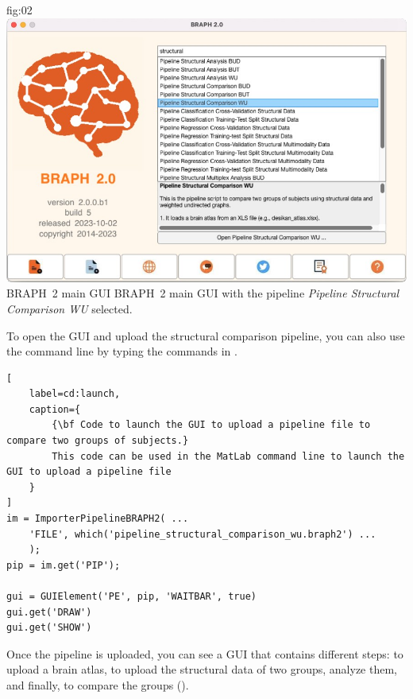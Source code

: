 \documentclass[justified]{tufte-handout}
\begin{document}
 {fig:02}
 {\includegraphics{fig02.jpg}}
	{BRAPH~2 main GUI}
	{
	BRAPH~2 main GUI with the pipeline \emph{Pipeline Structural Comparison WU} selected.
	}


\begin{tcolorbox}[
	title=Pipeline launch from command line
	]
	To open the GUI and upload the structural comparison pipeline, you can also use the command line by typing the commands in .

\begin{lstlisting}[
	label=cd:launch,
	caption={
		{\bf Code to launch the GUI to upload a pipeline file to compare two groups of subjects.}
		This code can be used in the MatLab command line to launch the GUI to upload a pipeline file
	}
]
im = ImporterPipelineBRAPH2( ...
	'FILE', which('pipeline_structural_comparison_wu.braph2') ...
	);
pip = im.get('PIP');
	
gui = GUIElement('PE', pip, 'WAITBAR', true)
gui.get('DRAW')
gui.get('SHOW')
\end{lstlisting}
\end{tcolorbox}


Once the pipeline is uploaded, you can see a GUI that contains different steps: to upload a brain atlas, to upload the structural data of two groups, analyze them, and finally, to compare the groups (). 
\end{document}
